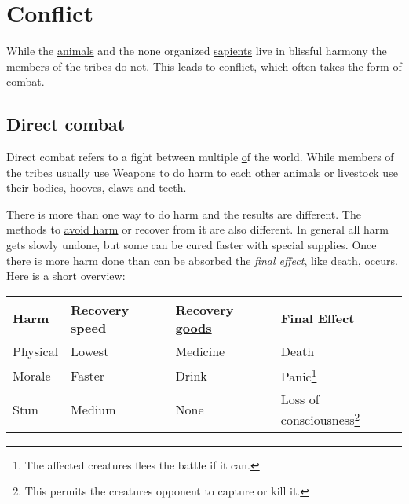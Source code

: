 \chapter{Conflict}\label{ch:Conflict}

While the \hyperref[ch:World:Inhabitants:Animals]{animals} and the none
organized \hyperref[ch:World:Inhabitants:Sapients]{sapients} live in blissful
harmony the members of the \hyperref[ch:Tribes]{tribes} do not. This leads to
conflict, which often takes the form of combat.

\section{Direct combat}\label{ch:Conflict:Combat}

Direct combat refers to a fight between multiple
\hyperref[ch:World:Inhabitants] of the world. While members of the
\hyperref[ch:Tribes]{tribes} usually use \glspl{Weapon} to do harm to each
other \hyperref[ch:World:Inhabitants:Animals]{animals} or
\hyperref[ch:World:Inhabitants:Livestock]{livestock} use their bodies, hooves,
claws and teeth.

There is more than one way to do harm and the results are different. The
methods to \hyperref[ch:Goods:Armory:Armor]{avoid harm} or recover from it are
also different. In general all harm gets slowly undone, but some can be cured
faster with special supplies. Once there is more harm done than can be absorbed
the \emph{final effect}, like death, occurs. Here is a short overview:

\begin{longtable}{llll}
	\toprule
	Harm     & Recovery speed & Recovery \hyperref[ch:Goods]{goods} & Final Effect                                                                               \\
	\midrule
	Physical & Lowest         & \Gls{Medicine}                      & Death                                                                                      \\
	Morale   & Faster         & \Gls{Drink}                         & Panic\footnote{The affected creatures flees the battle if it can.}                         \\
	Stun     & Medium         & None                                & Loss of consciousness\footnote{This permits the creatures opponent to capture or kill it.} \\
	\bottomrule
\end{longtable}

